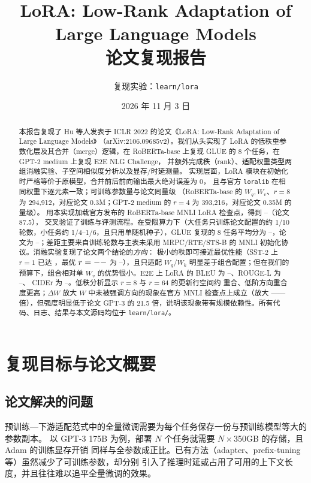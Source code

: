 \documentclass[11pt,a4paper]{ctexart}
\title{\textbf{LoRA: Low-Rank Adaptation of\\ Large Language Models}\\[4pt]
\large 论文复现报告}
\author{复现实验：\texttt{learn/lora}}
\date{2026 年 11 月 3 日}
\providecommand{\GlueOursAvg}{--}\providecommand{\GluePaperAvg}{--}\providecommand{\GlueGap}{--}
\providecommand{\RankBestScore}{--}\providecommand{\TgtBest}{--}\providecommand{\TgtBestScore}{--}
\providecommand{\EtwoLoraBleu}{--}\providecommand{\EtwoLoraRouge}{--}\providecommand{\EtwoLoraCider}{--}
\providecommand{\OfficialAvg}{--}\providecommand{\InitMrpcBase}{--}\providecommand{\InitMrpcMnli}{--}
\providecommand{\OffProjAmpQ}{--}\providecommand{\OffProjAmpV}{--}\providecommand{\OffProjRatioQ}{--}
\begin{document}
\maketitle
\thispagestyle{empty}

\begin{abstract}
\noindent
本报告复现了 Hu 等人发表于 ICLR 2022 的论文《LoRA: Low-Rank Adaptation of Large Language Models》
（arXiv:2106.09685v2）。我们从头实现了 LoRA 的低秩重参数化层及其合并（merge）逻辑，在
RoBERTa-base 上复现 GLUE 的 8 个任务，在 GPT-2 medium 上复现 E2E NLG Challenge，
并额外完成秩（rank）、适配权重类型两组消融实验、子空间相似度分析以及显存/时延测量。
实现层面，LoRA 模块在初始化时严格等价于原模型，合并前后前向输出最大绝对误差为 $0$，
且与官方 \texttt{loralib} 在相同权重下逐元素一致；可训练参数量与论文同量级
（RoBERTa-base 的 $W_q,W_v$、$r=8$ 为 294,912，对应论文 0.3M；GPT-2 medium 的 $r=4$
为 393,216，对应论文 0.35M 的量级）。
用本实现加载官方发布的 RoBERTa-base MNLI LoRA 检查点，得到 \OfficialAvg{}（论文 87.5），
交叉验证了训练与评测流程。在受限算力下（大任务只训练论文配置的约 1/10 轮数，小任务约
1/4--1/6，且只用单随机种子），GLUE 复现的 8 任务平均分为 \GlueOursAvg{}，论文为
\GluePaperAvg{}；差距主要来自训练轮数与主表未采用 MRPC/RTE/STS-B 的 MNLI 初始化协议。消融实验复现了论文两个结论的\emph{方向}：
极小的秩即可接近最优性能（SST-2 上 $r=1$ 已达 \RankOneScore{}，最优 $r=--$ 为
\RankBestScore{}），且只适配 $W_q$/$W_k$ 明显差于组合配置；但在我们的预算下，组合相对单
$W_v$ 的优势很小。E2E 上 LoRA 的 BLEU 为 \EtwoLoraBleu{}、ROUGE-L 为 \EtwoLoraRouge{}、
CIDEr 为 \EtwoLoraCider{}。低秩分析显示 $r=8$ 与 $r=64$ 的更新行空间约
\PhiQFull{} 重合、低阶方向重合度更高；$\Delta W$ 放大 $W$ 中未被强调方向的现象在官方
MNLI 检查点上成立（放大 \OffProjAmpQ--\OffProjAmpV 倍），但强度明显低于论文 GPT-3 的
21.5 倍，说明该现象带有规模依赖性。所有代码、日志、结果与本文源码均位于
\texttt{learn/lora/}。
\end{abstract}

\tableofcontents
\newpage

\section{复现目标与论文概要}

\subsection{论文解决的问题}
预训练—下游适配范式中的全量微调需要为每个任务保存一份与预训练模型等大的参数副本。
以 GPT-3 175B 为例，部署 $N$ 个任务就需要 $N\times$350GB 的存储，且 Adam 的训练显存开销
同样与全参数成正比。已有方法（adapter、prefix-tuning 等）虽然减少了可训练参数，却分别
引入了推理时延或占用了可用的上下文长度，并且往往难以追平全量微调的效果。
\end{document}
